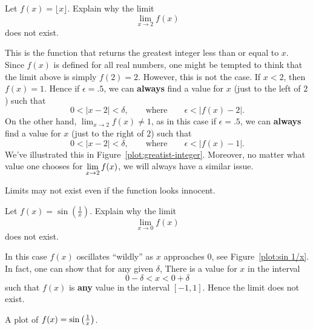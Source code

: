 \begin{example}
Let $f(x) = \lfloor x\rfloor$. Explain why the limit
\[
\lim_{x\to 2} f(x)
\]
does not exist.

\begin{solution}
This is the function that returns the greatest integer less than or
equal to $x$. Since $f(x)$ is defined for all real numbers, one might
be tempted to think that the limit above is simply $f(2) =
2$. However, this is not the case.  If $x<2$, then $f(x) =1$. Hence if
$\epsilon = .5$, we can \textbf{always} find a value for $x$ (just to
the left of $2$) such that
\[
0< |x -2|< \delta, \qquad\text{where} \qquad \epsilon < |f(x)-2|.
\]
On the other hand, $\lim_{x\to 2} f(x)\ne 1$, as in this case if
$\epsilon=.5$, we can \textbf{always} find a value for $x$ (just to
the right of $2$) such that
\[
0<|x- 2|<\delta, \qquad\text{where} \qquad  \epsilon<|f(x)-1|.
\]
We've illustrated this in
Figure~\ref{plot:greatist-integer}. Moreover, no matter what value one
chooses for $\displaystyle \lim_{x\to 2} f(x)$, we will always have a similar
issue.
\end{solution}
\end{example}


Limits may not exist even if the function looks innocent. 

\begin{example}
Let  $f(x) = \sin\left(\frac{1}{x}\right)$. Explain why the limit
\[
\lim_{x\to 0} f(x)
\]
does not exist.

\begin{solution}
In this case $f(x)$ oscillates ``wildly'' as $x$ approaches $0$, see
Figure~\ref{plot:sin 1/x}. In fact, one can show that for any given
  $\delta$, There is a value for $x$ in the interval
\[
0-\delta < x < 0+\delta
\]
such that $f(x)$ is \textbf{any} value in the interval $[-1,1]$. Hence
the limit does not exist.
\end{solution}
\end{example}
\begin{marginfigure}[-1in]
\caption{A plot of $f(x)=\protect\sin\left(\frac{1}{x}\right)$.}
\label{plot:sin 1/x}
\end{marginfigure}

